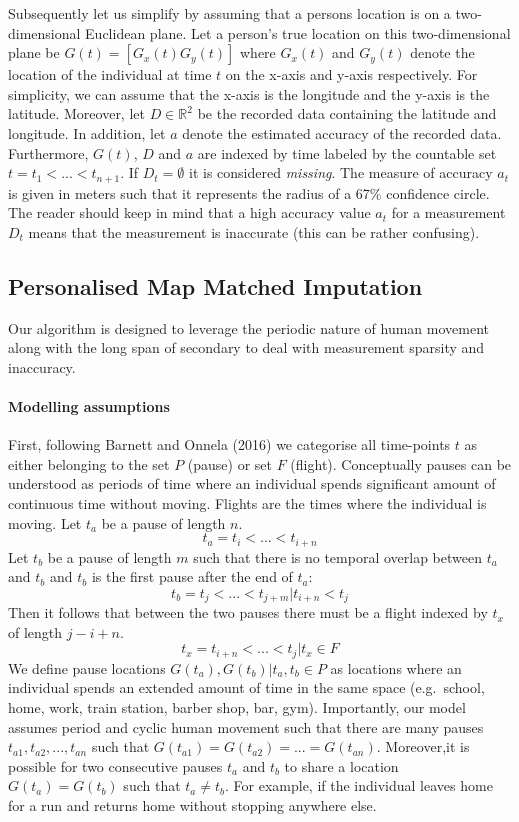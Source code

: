\documentclass[man]{apa6}
\theoremstyle{definition}
\theoremstyle{definition}
\theoremstyle{definition}
\theoremstyle{remark}
\begin{document}
Subsequently let us simplify by assuming that a persons location is on a
two-dimensional Euclidean plane. Let a person's true location on this
two-dimensional plane be \(G(t) = [G_x(t) G_y(t)]\) where \(G_x(t)\) and
\(G_y(t)\) denote the location of the individual at time \(t\) on the
x-axis and y-axis respectively. For simplicity, we can assume that the
x-axis is the longitude and the y-axis is the latitude. Moreover, let
\(D \in \mathbb{R}^2\) be the recorded data containing the latitude and
longitude. In addition, let \(a\) denote the estimated accuracy of the
recorded data. Furthermore, \(G(t)\), \(D\) and \(a\) are indexed by
time labeled by the countable set \(t = t_1 < ... < t_{n+1}\). If
\(D_t = \emptyset\) it is considered \emph{missing}. The measure of
accuracy \(a_t\) is given in meters such that it represents the radius
of a 67\% confidence circle. The reader should keep in mind that a high
accuracy value \(a_t\) for a measurement \(D_t\) means that the
measurement is inaccurate (this can be rather confusing).

\subsection{Personalised Map Matched
Imputation}\label{personalised-map-matched-imputation}

Our algorithm is designed to leverage the periodic nature of human
movement along with the long span of secondary to deal with measurement
sparsity and inaccuracy.

\paragraph{Modelling assumptions}\label{modelling-assumptions}

First, following Barnett and Onnela (2016) we categorise all time-points
\(t\) as either belonging to the set \(P\) (pause) or set \(F\)
(flight). Conceptually pauses can be understood as periods of time where
an individual spends significant amount of continuous time without
moving. Flights are the times where the individual is moving. Let
\(t_a\) be a pause of length \(n\). \[t_a = t_i < ... < t_{i+n}\] Let
\(t_b\) be a pause of length \(m\) such that there is no temporal
overlap between \(t_a\) and \(t_b\) and \(t_b\) is the first pause after
the end of \(t_a\): \[t_b = t_j < ... < t_{j+m}|t_{i+n}< t_j\] Then it
follows that between the two pauses there must be a flight indexed by
\(t_x\) of length \(j-i+n\). \[t_x =  t_{i+n} < ... < t_{j} |t_x \in F\]
We define pause locations \(G(t_a), G(t_b) | t_a, t_b \in P\) as
locations where an individual spends an extended amount of time in the
same space (e.g.~school, home, work, train station, barber shop, bar,
gym). Importantly, our model assumes period and cyclic human movement
such that there are many pauses \(t_{a1},t_{a2},...,t_{an}\) such that
\(G(t_{a1}) = G(t_{a2}) = ... = G(t_{an})\). Moreover,it is possible for
two consecutive pauses \(t_a\) and \(t_b\) to share a location
\(G(t_a) = G(t_b)\) such that \(t_a \ne t_b\). For example, if the
individual leaves home for a run and returns home without stopping
anywhere else.
\end{document}

